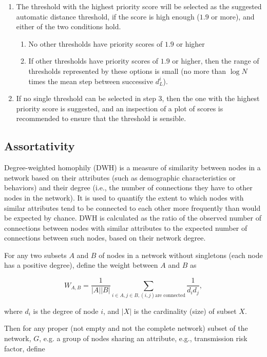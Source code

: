 \documentclass[utf8]{FrontiersinHarvard} %
\begin{document}
\begin{enumerate}
	\item{The threshold with the highest priority score will be selected as the suggested automatic distance threshold, if the score is high enough ($1.9$ or more), and either of the two conditions hold.
	            \begin{enumerate}
		            \item{No other thresholds have priority scores of $1.9$ or higher}
		            \item{If other thresholds have priority scores of $1.9$ or higher, then the range of thresholds represented by these options is small (no more than $\log N$ times the mean step between successive $d_L^i$).}
	            \end{enumerate}}

	\item{If no single threshold can be selected in step 3, then the one with the highest priority score is suggested, and an inspection of a plot of scores is recommended to ensure that the threshold is sensible.}
\end{enumerate}

\subsection{Assortativity}

Degree-weighted homophily (DWH) is a measure of similarity between nodes in a
network based on their attributes (such as demographic characteristics or
behaviors) and their degree (i.e., the number of connections they have to other
nodes in the network). It is used to quantify the extent to which nodes with
similar attributes tend to be connected to each other more frequently than
would be expected by chance\cite{RePEc:adr:anecst:y:2012:i:107-108:p:33-48}. DWH is calculated as the
ratio of the observed number of connections between nodes with similar
attributes to the expected number of connections between such nodes, based on
their network degree.

For any two subsets $A$ and $B$ of nodes in a network without singletons (each node has a positive degree), define the weight between $A$ and $B$ as 
    
 \[
 W_{A,B} = \frac{1}{|A||B|} \sum_{i \in A, j\in B, (i,j) \text{are connected}} \frac{1}{d_i d_j},
 \]
 
 where $d_i$ is the degree of node $i$, and $|X|$ is the cardinality (size) of subset $X$.
 
 Then for any proper (not empty and not the complete network) subset of the network, $G$, e.g. a group of nodes sharing an attribute, e.g., transmission risk factor, define 
 
\end{document}

